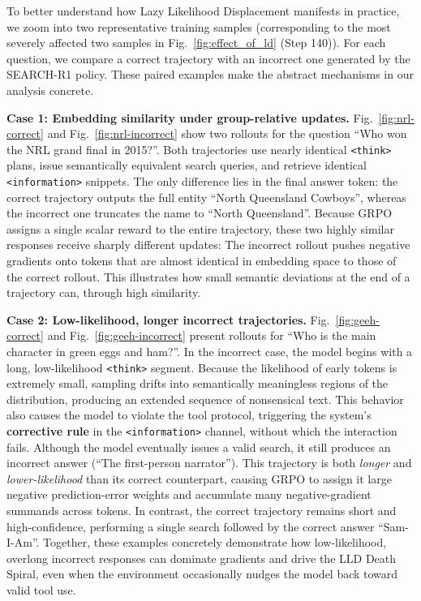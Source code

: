 To better understand how Lazy Likelihood Displacement manifests in practice, we zoom into two representative training samples (corresponding to the most severely affected two samples in Fig.~\ref{fig:effect_of_ld} (Step 140)). For each question, we compare a correct trajectory with an incorrect one generated by the SEARCH-R1 policy. These paired examples make the abstract mechanisms in our analysis concrete.

\textbf{Case 1: Embedding similarity under group-relative updates.}
Fig.~\ref{fig:nrl-correct} and Fig.~\ref{fig:nrl-incorrect} show two rollouts for the question
``Who won the NRL grand final in 2015?''. Both trajectories use nearly identical
\texttt{<think>} plans, issue semantically equivalent search queries, and retrieve identical \texttt{<information>} snippets. The only difference lies in the
final answer token: the correct trajectory outputs the full entity
``North Queensland Cowboys'', whereas the incorrect one truncates the name to
``North Queensland''. Because GRPO assigns a single scalar reward to the entire
trajectory, these two highly similar responses receive sharply different updates:
The incorrect rollout pushes negative gradients onto tokens that are almost
identical in embedding space to those of the correct rollout. This illustrates
how small semantic deviations at the end of a trajectory can, through high similarity.

\textbf{Case 2: Low-likelihood, longer incorrect trajectories.}
Fig.~\ref{fig:geeh-correct} and Fig.~\ref{fig:geeh-incorrect} present rollouts for
``Who is the main character in green eggs and ham?''. In the incorrect case, the model begins with a long, low-likelihood \texttt{<think>} segment. Because the likelihood of early tokens is extremely small, sampling drifts into semantically meaningless regions of the distribution, producing an extended sequence of nonsensical text. This behavior also causes the model to violate the tool protocol, triggering the system’s \textbf{corrective rule} in the \texttt{<information>} channel, without which the interaction fails. Although the model
eventually issues a valid search, it still produces an incorrect answer
(``The first-person narrator''). This trajectory is both \emph{longer} and
\emph{lower-likelihood} than its correct counterpart, causing GRPO to assign it
large negative prediction-error weights and accumulate many negative-gradient
summands across tokens. In contrast, the correct trajectory remains short and
high-confidence, performing a single search followed by the correct answer
``Sam-I-Am''. Together, these examples concretely demonstrate how low-likelihood,
overlong incorrect responses can dominate gradients and drive the LLD Death
Spiral, even when the environment occasionally nudges the model back toward
valid tool use.


